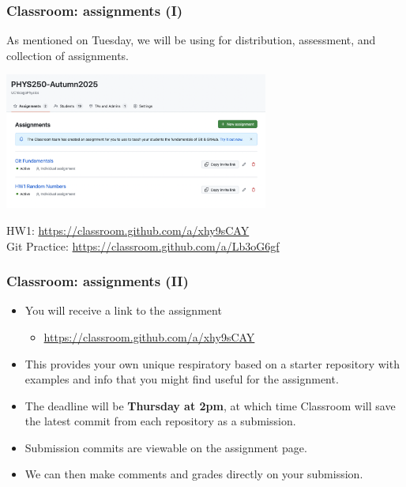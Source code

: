 \documentclass[hyperref={colorlinks=true}]{beamer}
\begin{document}
\begin{frame}%
  \frametitle{\github Classroom: assignments (I)}
  
  As mentioned on Tuesday, we will be using \github for distribution, assessment, and collection of assignments. 
  
  \begin{center}
    \includegraphics[width=0.65\textwidth]{GitHubClassroom-Assignment1.png}
  \end{center}
  
  
  \centering HW1: \url{https://classroom.github.com/a/xhy9sCAY} \\
  \centering Git Practice: \url{https://classroom.github.com/a/Lb3oG6gf}

\end{frame}


\begin{frame}%
  \frametitle{\github Classroom: assignments (II)}
  
  \begin{itemize}
    \item You will receive a link to the assignment
    \begin{itemize}
      \item \url{https://classroom.github.com/a/xhy9sCAY}
    \end{itemize}
    \item This provides your own unique respiratory based on a starter repository with examples and info that you might find useful for the assignment. 
    \item The deadline will be \textbf{Thursday at 2pm}, at which time \github Classroom will save the latest commit from each repository as a submission. 
    \item Submission commits are viewable  on the assignment page. 
    \item We can then make comments and grades directly on your submission.
  \end{itemize}
  


\end{frame}
\end{document}
